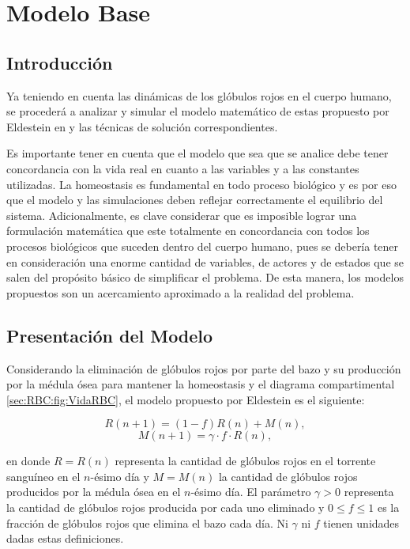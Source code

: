 
\chapter{Modelo Base}\label{chap:modelo}
\section{Introducción}\label{sec:modelo:intro}
Ya teniendo en cuenta las dinámicas de los glóbulos rojos en el cuerpo humano, se procederá a analizar y simular el modelo matemático de estas propuesto por Eldestein en \cite{edelstein2005} y las técnicas de solución correspondientes. 

Es importante tener en cuenta que el modelo que sea que se analice debe tener concordancia con la vida real en cuanto a las variables y a las constantes utilizadas. La homeostasis es fundamental en todo proceso biológico y es por eso que el modelo y las simulaciones deben reflejar correctamente el equilibrio del sistema. Adicionalmente, es clave considerar que es imposible lograr una formulación matemática que este totalmente en concordancia con todos los procesos biológicos que suceden dentro del cuerpo humano, pues se debería tener en consideración una enorme cantidad de variables, de actores y de estados que se salen del propósito básico de simplificar el problema. De esta manera, los modelos propuestos son un acercamiento aproximado a la realidad del problema.

\section{Presentación del Modelo}\label{sec:modelo:presentacion}

Considerando la eliminación de glóbulos rojos por parte del bazo y su producción por la médula ósea para mantener la homeostasis y el diagrama compartimental \ref{sec:RBC:fig:VidaRBC}, el modelo propuesto por Eldestein es el siguiente:

$$R(n+1)=(1-f)R(n)+M(n),$$
$$M(n+1)=\gamma \cdot f\cdot R(n),$$

en donde $R=R(n)$ representa la cantidad de glóbulos rojos en el torrente sanguíneo en el $n$-ésimo día y $M=M(n)$ la cantidad de glóbulos rojos producidos por la médula ósea en el $n$-ésimo día. El parámetro $\gamma>0$ representa la cantidad de glóbulos rojos producida por cada uno eliminado y $0\leq f \leq 1$ es la fracción de glóbulos rojos que elimina el bazo cada día. Ni $\gamma$ ni $f$ tienen unidades dadas estas definiciones.

